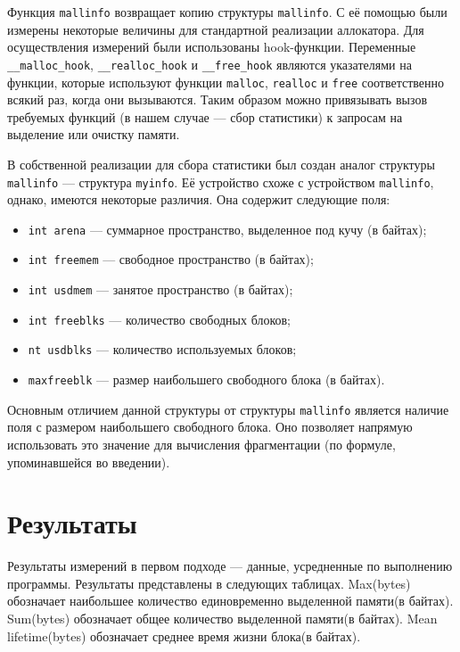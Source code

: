 \documentclass[12pt,a4paper]{article}
\begin{document}
   Функция \texttt{mallinfo} возвращает копию структуры \texttt{mallinfo}. С её помощью были измерены некоторые величины для стандартной реализации аллокатора. 
   Для осуществления измерений были использованы hook-функции. Переменные \texttt{\_\_malloc\_hook}, \texttt{\_\_realloc\_hook} и \texttt{\_\_free\_hook} являются 
   указателями на функции, которые используют функции \texttt{malloc}, \texttt{realloc} и \texttt{free} соответственно всякий раз, когда они вызываются. Таким 
   образом можно привязывать вызов требуемых функций (в нашем случае --- сбор статистики) к запросам на выделение или очистку памяти.
   
   В собственной реализации для сбора статистики был создан аналог структуры \texttt{mallinfo} --- структура \texttt{myinfo}.
   Её устройство схоже с устройством \texttt{mallinfo}, однако, имеются некоторые различия. Она содержит следующие поля:
   \begin{itemize}
     \item \texttt{int arena} --- суммарное пространство, выделенное под кучу (в байтах);
     \item \texttt{int freemem} --- свободное пространство (в байтах);
     \item \texttt{int usdmem} --- занятое пространство (в байтах);
     \item \texttt{int freeblks} --- количество свободных блоков;
     \item \texttt{nt usdblks} --- количество используемых блоков;
     \item \texttt{maxfreeblk} --- размер наибольшего свободного блока (в байтах).
   \end{itemize} 
   
   Основным отличием данной структуры от структуры \texttt{mallinfo} является наличие поля с размером наибольшего свободного
   блока. Оно позволяет напрямую использовать это значение для вычисления фрагментации (по формуле, упоминавшейся
   во введении).
   
   \newpage
   \section{Результаты}
   
   Результаты измерений в первом подходе --- данные, усредненные по выполнению программы. Результаты представлены в следующих таблицах. Max(bytes) обозначает
   наибольшее количество единовременно выделенной памяти(в байтах). Sum(bytes) обозначает общее количество выделенной памяти(в байтах). Mean lifetime(bytes)
   обозначает среднее время жизни блока(в байтах).
    
\end{document}
